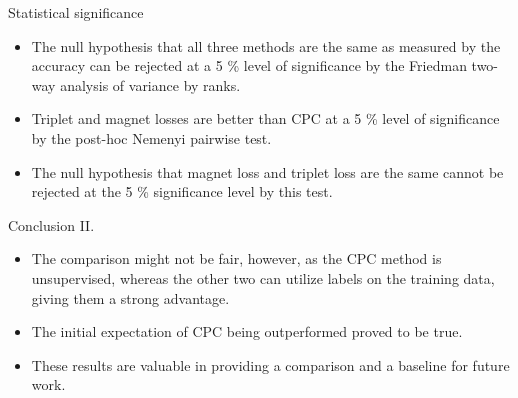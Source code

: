 \documentclass[10pt]{beamer}
\begin{document}
\begin{frame}{Statistical significance}
	\begin{itemize}
		\item The null hypothesis that all three methods are the same as measured by the accuracy can be rejected at a 5 \% level of significance by the Friedman two-way analysis of variance by ranks.
		\item Triplet and magnet losses are better than CPC at a 5 \% level of significance by the post-hoc Nemenyi pairwise test.
		\item The null hypothesis that magnet loss and triplet loss are the same cannot be rejected at the 5 \% significance level by this test.
	\end{itemize}
\end{frame}

\begin{frame}{Conclusion II.}
	\begin{itemize}
		\item The comparison might not be fair, however, as the CPC method is unsupervised, whereas the other two can utilize labels on the training data, giving them a strong advantage.
		\item The initial expectation of CPC being outperformed proved to be true.
		\item These results are valuable in providing a comparison and a baseline for future work.
	\end{itemize}
\end{frame}

\begin{frame}
	\titlepage
\end{frame}
\end{document}

